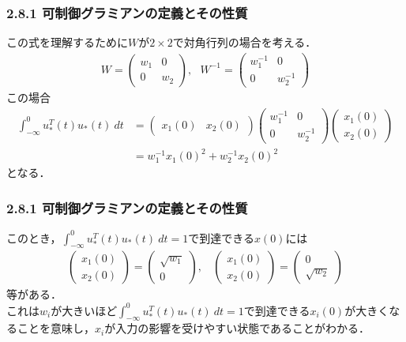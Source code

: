 \begin{frame}[t]
\frametitle{2.8.1 可制御グラミアンの定義とその性質}
この式を理解するために$W$が$2 \times 2$で対角行列の場合を考える．
\begin{align}
	W = 
	\left(\begin{array}{cc}
         w_1 & 0 \\
	 0   & w_2 
	\end{array}\right)
	, \ \ \ 
	W^{-1} = 
	\left(\begin{array}{cc}
         w_1^{-1} & 0 \\
	 0   & w_2^{-1} 
	\end{array}\right)
\end{align}
この場合
\begin{align}
	\int_{-\infty}^{0} u_*^T(t) u_*(t) \ dt 
	&=
	\left(\begin{array}{cc}
         x_1(0) & x_2(0) 
	\end{array}\right)
	\left(\begin{array}{cc}
         w_1^{-1} & 0 \\
	 0   & w_2^{-1} 
	\end{array}\right)
	\left(\begin{array}{c}
         x_1(0)\\
	 x_2(0) 
	\end{array}\right)
\\
	&= w_1^{-1} x_1(0)^2 + w_2^{-1} x_2(0)^2
\nonumber
\end{align}
となる．
\end{frame}

\begin{frame}[t]
\frametitle{2.8.1 可制御グラミアンの定義とその性質}
このとき，$\int_{-\infty}^{0} u_*^T(t) u_*(t) \ dt =1$で到達できる$x(0)$には
\begin{align}
	\left(\begin{array}{c}
         x_1(0)\\
	 x_2(0) 
	\end{array}\right)
	= 
	\left(\begin{array}{c}
         \sqrt{w_1}\\
	 0 
	\end{array}\right)
	, \ \ \ \ 
	\left(\begin{array}{c}
         x_1(0)\\
	 x_2(0) 
	\end{array}\right)
	= 
	\left(\begin{array}{c}
         0\\
	 \sqrt{w_2} 
	\end{array}\right)
\end{align}
等がある．
\\[3mm]

これは$w_i$が大きいほど$\int_{-\infty}^{0} u_*^T(t) u_*(t) \ dt =1$で到達できる$x_i(0)$が大きくなることを意味し，$x_i$が入力の影響を受けやすい状態であることがわかる．
\end{frame}

